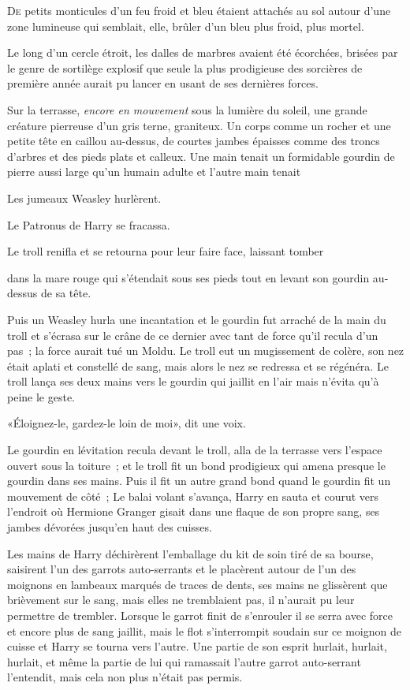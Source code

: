 
\lettrine{D}{e} petits monticules d'un feu froid et bleu étaient attachés au sol autour d'une zone lumineuse qui semblait, elle, brûler d'un bleu plus froid, plus mortel.

Le long d'un cercle étroit, les dalles de marbres avaient été écorchées, brisées par le genre de sortilège explosif que seule la plus prodigieuse des sorcières de première année aurait pu lancer en usant de ses dernières forces.

Sur la terrasse, \emph{encore en mouvement} sous la lumière du soleil, une grande créature pierreuse d'un gris terne, graniteux. Un corps comme un rocher et une petite tête en caillou au-dessus, de courtes jambes épaisses comme des troncs d'arbres et des pieds plats et calleux. Une main tenait un formidable gourdin de pierre aussi large qu'un humain adulte et l'autre main tenait

Les jumeaux Weasley hurlèrent.

Le Patronus de Harry se fracassa.

Le troll renifla et se retourna pour leur faire face, laissant tomber

dans la mare rouge qui s'étendait sous ses pieds tout en levant son gourdin au-dessus de sa tête.

Puis un Weasley hurla une incantation et le gourdin fut arraché de la main du troll et s'écrasa sur le crâne de ce dernier avec tant de force qu'il recula d'un pas~; la force aurait tué un Moldu. Le troll eut un mugissement de colère, son nez était aplati et constellé de sang, mais alors le nez se redressa et se régénéra. Le troll lança ses deux mains vers le gourdin qui jaillit en l'air mais n'évita qu'à peine le geste.

«Éloignez-le, gardez-le loin de moi», dit une voix.

Le gourdin en lévitation recula devant le troll, alla de la terrasse vers l'espace ouvert sous la toiture~; et le troll fit un bond prodigieux qui amena presque le gourdin dans ses mains. Puis il fit un autre grand bond quand le gourdin fit un mouvement de côté~; Le balai volant s'avança, Harry en sauta et courut vers l'endroit où Hermione Granger gisait dans une flaque de son propre sang, ses jambes dévorées jusqu'en haut des cuisses.

Les mains de Harry déchirèrent l'emballage du kit de soin tiré de sa bourse, saisirent l'un des garrots auto-serrants et le placèrent autour de l'un des moignons en lambeaux marqués de traces de dents, ses mains ne glissèrent que brièvement sur le sang, mais elles ne tremblaient pas, il n'aurait pu leur permettre de trembler. Lorsque le garrot finit de s'enrouler il se serra avec force et encore plus de sang jaillit, mais le flot s'interrompit soudain sur ce moignon de cuisse et Harry se tourna vers l'autre. Une partie de son esprit hurlait, hurlait, hurlait, et même la partie de lui qui ramassait l'autre garrot auto-serrant l'entendit, mais cela non plus n'était pas permis.

